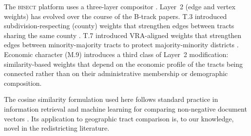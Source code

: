 The \textsc{bisect} platform uses a three-layer compositor
\citep{bisect2024}.
Layer~2 (edge and vertex weights) has evolved over the course of the
B-track papers.
T.3 introduced subdivision-respecting (county) weights that strengthen
edges between tracts sharing the same county \citep{b10county}.
T.7 introduced VRA-aligned weights that strengthen edges between
minority-majority tracts to protect majority-minority districts \citep{b14vra}.
Economic character (M.9) introduces a third class of Layer~2 modification:
similarity-based weights that depend on the economic profile of the tracts
being connected rather than on their administrative membership or
demographic composition.

The cosine similarity formulation used here follows standard practice in
information retrieval and machine learning for comparing non-negative
document vectors \citep{manning2008ir}.
Its application to geographic tract comparison is, to our knowledge, novel
in the redistricting literature.
